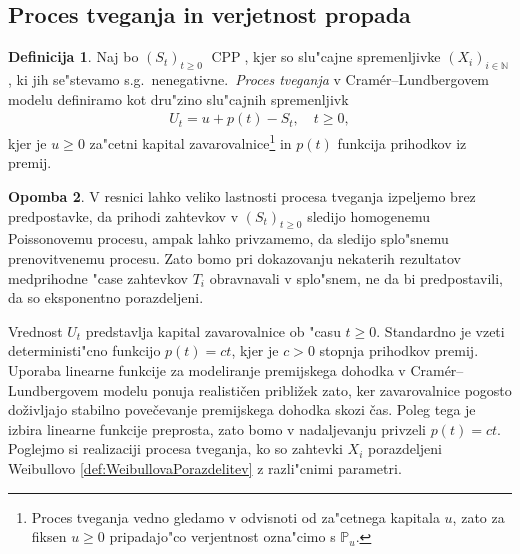 \documentclass[12pt, a4paper, reqno]{amsart}
\theoremstyle{definition}
\newtheorem{definicija}{Definicija}[section]
\newtheorem{opomba}[definicija]{Opomba}
\theoremstyle{plain}
\newcommand{\N}{\mathbb{N}}
\newcommand{\Prob}{\mathbb{P}}
\newcommand{\1}{\mathds{1}}
\DeclareMathOperator{\CPP}{CPP}
\newcommand*{\refPriloga}[1]{%
  \begingroup
    \hypersetup{
      linkcolor=red,
      linkbordercolor=red,
    }%
    \ref{#1}%
  \endgroup
}
\begin{document}
    \subsection{Proces tveganja in verjetnost propada}

        \begin{definicija}
            Naj bo $(S_t)_{t\geq0 }$ $\CPP$, kjer so slu"cajne spremenljivke $(X_i)_{i\in\N}$, 
            ki jih se"stevamo s.g.\ nenegativne.\ \textit{Proces tveganja} v Cramér--Lundbergovem 
            modelu definiramo kot dru"zino slu"cajnih spremenljivk 
            \begin{align*}
                U_t = u + p(t) - S_t, \quad t\geq0,
            \end{align*}
            kjer je $u \geq 0$ za"cetni kapital zavarovalnice\footnote{Proces tveganja vedno gledamo 
            v odvisnoti od  za"cetnega kapitala $u$, zato za fiksen $u\geq0$ pripadajo"co verjentnost
            ozna"cimo s $\Prob_u$.} in $p(t)$ funkcija prihodkov iz premij. 
            \label{def:procesTveganja}
        \end{definicija}

        \begin{opomba}
            V resnici lahko veliko lastnosti procesa tveganja izpeljemo brez predpostavke, da prihodi 
            zahtevkov v $(S_t)_{t\geq0}$ sledijo homogenemu Poissonovemu procesu,
            ampak lahko privzamemo, da sledijo splo"snemu prenovitvenemu procesu. 
            Zato bomo pri dokazovanju nekaterih rezultatov medprihodne "case zahtevkov $T_i$ obravnavali v 
            splo"snem, ne da bi predpostavili, da so eksponentno porazdeljeni.
            \label{op:procesTveganja}
        \end{opomba}

        Vrednost $U_t$ predstavlja kapital zavarovalnice ob "casu $t\geq0$. Standardno je  
        vzeti deterministi"cno funkcijo $p(t) = ct$, kjer je $c>0$ stopnja prihodkov premij.
        Uporaba linearne funkcije za modeliranje premijskega dohodka v Cramér--Lundbergovem 
        modelu ponuja realističen približek zato, ker zavarovalnice pogosto doživljajo 
        stabilno povečevanje premijskega dohodka skozi čas. Poleg tega je izbira linearne 
        funkcije preprosta, zato bomo v nadaljevanju privzeli $p(t) = ct$. Poglejmo si 
        realizaciji procesa tveganja, ko so zahtevki $X_i$ porazdeljeni Weibullovo 
        \refPriloga{def:WeibullovaPorazdelitev} z razli"cnimi parametri. 
\end{document}
